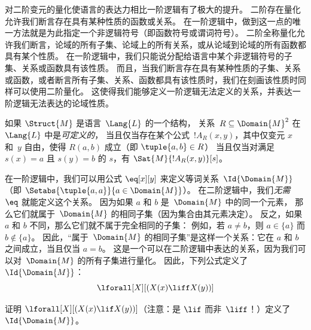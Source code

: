 \documentclass[../../../include/open-logic-section]{subfiles}
\begin{document}

\begin{explain}
对二阶变元的量化使语言的表达力相比一阶逻辑有了极大的提升。
二阶存在量化允许我们断言存在具有某种性质的函数或关系。
在一阶逻辑中，做到这一点的唯一方法就是为此指定一个非逻辑符号（即函数符号或谓词符号）。
二阶全称量化允许我们断言，论域的所有子集、论域上的所有关系，或从论域到论域的所有函数都具有某个性质。
在一阶逻辑中，我们只能说分配给语言中某个非逻辑符号的子集、关系或函数具有该性质。
而且，当我们断言存在具有某种性质的子集、关系或函数，或者断言所有子集、关系、函数都具有该性质时，我们在刻画该性质时同样可以使用二阶量化。
这使得我们能够定义一阶逻辑无法定义的关系，并表达一阶逻辑无法表达的论域性质。
\end{explain}


\begin{defn}
如果 $\Struct{M}$ 是语言~$\Lang{L}$ 的一个结构，
关系~$R \subseteq \Domain{M}^2$ 在~$\Lang{L}$ 中是\emph{可定义的}，
当且仅当存在某个公式~$!A_R(x, y)$，其中仅变元 $x$ 和~$y$
自由，使得 $R(a, b)$ 成立（即 $\tuple{a,b} \in R$）
当且仅当对满足 $s(x) = a$ 且 $s(y)=b$ 的 $s$，有 $\Sat{M}{!A_R(x, y)}[s]$。
\end{defn}

\begin{ex}
在一阶逻辑中，我们可以用公式 $\eq[x][y]$ 来定义等词关系~$\Id{\Domain{M}}$
（即 $\Setabs{\tuple{a,a}}{a \in
  \Domain{M}}$）。
在二阶逻辑中，我们\emph{无需~$\eq$} 就能定义这个关系。
因为如果 $a$ 和 $b$ 是~$\Domain{M}$ 中的同一个元素，
那么它们就属于~$\Domain{M}$ 的相同子集（因为集合由其元素决定）。
反之，如果 $a$ 和 $b$ 不同，那么它们就不属于完全相同的子集：
例如，若 $a \neq b$，则 $a \in \{a\}$ 而 $b \notin \{a\}$。
因此，“属于~$\Domain{M}$ 的相同子集”是这样一个关系：它在 $a$ 和 $b$ 之间成立，当且仅当 $a = b$。
这是一个可以在二阶逻辑中表达的关系，因为我们可以对~$\Domain{M}$ 的所有子集进行量化。
因此，下列公式定义了 $\Id{\Domain{M}}$：
\[
\lforall[X][(X(x) \liff X(y))]
\]
\end{ex}

\begin{prob}
证明 $\lforall[X][(X(x) \lif X(y))]$（注意：是 $\lif$ 而非~$\liff$！）定义了 $\Id{\Domain{M}}$。
\end{prob}
\end{document}
